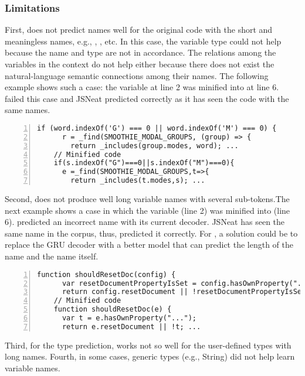 \vspace{-2pt}
\subsubsection{Limitations}
\label{sec:limitations}


First, {\tool} does not predict names well for the original code with
the short and meaningless names, e.g., , , etc. In
this case, the variable type could not help because the name and type
are not in accordance. The relations among the variables in the
context do not help either because there does not exist the
natural-language semantic connections among their names. The following
example shows such a case: the variable  at line 2 was
minified into  at line 6.  {\tool} failed this case and JSNeat
predicted correctly as it has seen the code with the same names. %
\begin{lstlisting}[basicstyle=\footnotesize\sffamily, stepnumber=1, numbers=left, numbersep=-10pt, framexleftmargin=-2mm,
    framexrightmargin=-2mm]
    if (word.indexOf('G') === 0 || word.indexOf('M') === 0) {
      r = _find(SMOOTHIE_MODAL_GROUPS, (group) => {
        return _includes(group.modes, word); ...
    // Minified code
    if(s.indexOf("G")===0||s.indexOf("M")===0){
      e =_find(SMOOTHIE_MODAL_GROUPS,t=>{
        return _includes(t.modes,s); ...
\end{lstlisting}
Second, {\tool} does not produce well long variable names with several
sub-tokens.The next example shows a case in which the variable
 (line 2) was minified
into  (line 6). {\tool} predicted an incorrect
name  with its current decoder. JSNeat
has seen the same name in the corpus, thus, predicted it correctly.
For {\tool}, a solution could be to replace the GRU decoder with a
better model that can predict the length of the name and the name
itself.
\begin{lstlisting}[basicstyle=\footnotesize\sffamily, stepnumber=1, numbers=left, numbersep=-10pt, framexleftmargin=-2mm,
    framexrightmargin=-2mm]
    function shouldResetDoc(config) {
      var resetDocumentPropertyIsSet = config.hasOwnProperty("...");
      return config.resetDocument || !resetDocumentPropertyIsSet; ...
    // Minified code
    function shouldResetDoc(e) {
      var t = e.hasOwnProperty("...");
      return e.resetDocument || !t; ...
\end{lstlisting}
Third, for the type prediction, {\tool} works not so well for
the user-defined types with long names. Fourth, in some cases,
generic types (e.g., String) did not help learn variable names.

